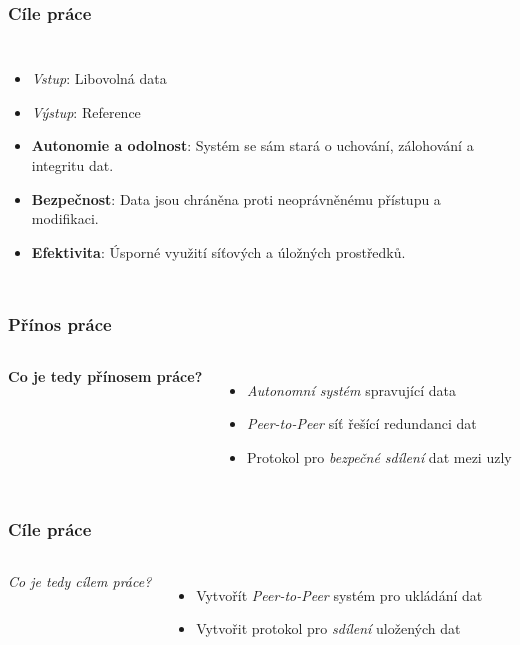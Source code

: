 \begin{frame}
  \frametitle{Cíle práce}
  \begin{columns}[c]
    \begin{itemize}
      \item \emph{Vstup}: Libovolná data
      \item \emph{Výstup}: Reference
      \pause
      \item \textbf{Autonomie a odolnost}: Systém se sám stará o
      uchování, zálohování a integritu dat.
      \pause
      \item \textbf{Bezpečnost}: Data jsou chráněna proti
      neoprávněnému přístupu a modifikaci.
      \pause
      \item \textbf{Efektivita}: Úsporné využití síťových a
      úložných prostředků.
    \end{itemize}
  \end{columns}
\end{frame}

\begin{frame}
  \frametitle{Přínos práce}
  \begin{columns}[c]
    \textbf{Co je tedy přínosem práce?}
    \pause
    \begin{itemize}
      \item \emph{Autonomní systém} spravující data
      \pause
      \item \emph{Peer-to-Peer} síť řešící redundanci dat
      \pause
      \item Protokol pro \emph{bezpečné sdílení} dat mezi uzly
    \end{itemize}
  \end{columns}
\end{frame}

\begin{frame}
  \frametitle{Cíle práce}
  \begin{columns}[c]
    \emph{Co je tedy cílem práce?}
    \pause
    \begin{itemize}
      \item Vytvořít \emph{Peer-to-Peer} systém pro ukládání dat
      \pause
      \item Vytvořit protokol pro \emph{sdílení} uložených dat
    \end{itemize}
  \end{columns}
\end{frame}

